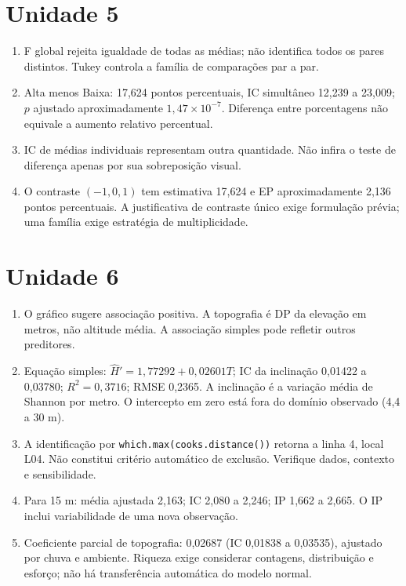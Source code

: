 \section*{Unidade 5}
\begin{enumerate}
\item F global rejeita igualdade de todas as médias; não identifica todos os pares distintos. Tukey controla a família de comparações par a par.
\item Alta menos Baixa: 17,624 pontos percentuais, IC simultâneo 12,239 a 23,009; $p$ ajustado aproximadamente $1{,}47\times10^{-7}$. Diferença entre porcentagens não equivale a aumento relativo percentual.
\item IC de médias individuais representam outra quantidade. Não infira o teste de diferença apenas por sua sobreposição visual.
\item O contraste $(-1,0,1)$ tem estimativa 17,624 e EP aproximadamente 2,136 pontos percentuais. A justificativa de contraste único exige formulação prévia; uma família exige estratégia de multiplicidade.
\end{enumerate}

\section*{Unidade 6}
\begin{enumerate}
\item O gráfico sugere associação positiva. A topografia é DP da elevação em metros, não altitude média. A associação simples pode refletir outros preditores.
\item Equação simples: $\widehat H'=1{,}77292+0{,}02601T$; IC da inclinação 0,01422 a 0,03780; $R^2=0{,}3716$; RMSE 0,2365. A inclinação é a variação média de Shannon por metro. O intercepto em zero está fora do domínio observado (4,4 a 30 m).
\item A identificação por \texttt{which.max(cooks.distance())} retorna a linha 4, local L04. Não constitui critério automático de exclusão. Verifique dados, contexto e sensibilidade.
\item Para 15 m: média ajustada 2,163; IC 2,080 a 2,246; IP 1,662 a 2,665. O IP inclui variabilidade de uma nova observação.
\item Coeficiente parcial de topografia: 0,02687 (IC 0,01838 a 0,03535), ajustado por chuva e ambiente. Riqueza exige considerar contagens, distribuição e esforço; não há transferência automática do modelo normal.
\end{enumerate}


